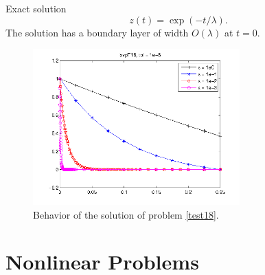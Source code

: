 \documentclass[<options>]{article}
\begin{document}
\textrm{Exact solution}
$$z(t) =   \exp(-t /\lambda).$$
The solution has a boundary layer of width $O(\lambda)$  at $t = 0.$

\begin{figure}[htb]
\centerline{\includegraphics[height=6cm]{Prob18}}
\caption{Behavior of the solution of problem \ref{test18}.}
\end{figure}
\newpage
\section{Nonlinear Problems}\label{Nonlinear}
\end{document}
